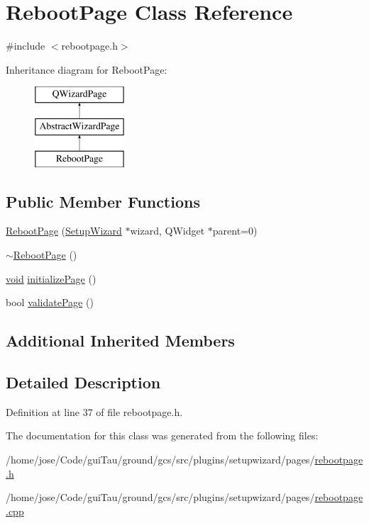 \hypertarget{class_reboot_page}{\section{Reboot\-Page Class Reference}
\label{class_reboot_page}
}


{\ttfamily \#include $<$rebootpage.\-h$>$}

Inheritance diagram for Reboot\-Page\-:\begin{figure}[H]
\begin{center}
\leavevmode
\includegraphics[height=3.000000cm]{class_reboot_page}
\end{center}
\end{figure}
\subsection*{Public Member Functions}
\begin{DoxyCompactItemize}
\item 
\hyperlink{group___reboot_page_ga555ddfd0582eb14ef5e695ab0949ad76}{Reboot\-Page} (\hyperlink{class_setup_wizard}{Setup\-Wizard} $\ast$wizard, Q\-Widget $\ast$parent=0)
\item 
\hyperlink{group___reboot_page_gac884b3b97511ed78d3a801cb6343bfd0}{$\sim$\-Reboot\-Page} ()
\item 
\hyperlink{group___u_a_v_objects_plugin_ga444cf2ff3f0ecbe028adce838d373f5c}{void} \hyperlink{group___reboot_page_gac953d3238347958e7bde24b139d59e2a}{initialize\-Page} ()
\item 
bool \hyperlink{group___reboot_page_ga2f844f901bd07ac2fbc496288b5f7d4b}{validate\-Page} ()
\end{DoxyCompactItemize}
\subsection*{Additional Inherited Members}


\subsection{Detailed Description}


Definition at line 37 of file rebootpage.\-h.



The documentation for this class was generated from the following files\-:\begin{DoxyCompactItemize}
\item 
/home/jose/\-Code/gui\-Tau/ground/gcs/src/plugins/setupwizard/pages/\hyperlink{rebootpage_8h}{rebootpage.\-h}\item 
/home/jose/\-Code/gui\-Tau/ground/gcs/src/plugins/setupwizard/pages/\hyperlink{rebootpage_8cpp}{rebootpage.\-cpp}\end{DoxyCompactItemize}
